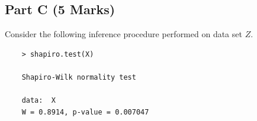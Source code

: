 \documentclass[a4paper,12pt]{article}
\begin{document}


\subsection*{Part C (5 Marks)} %


Consider the following inference procedure performed on data set $Z$.
\begin{center}
	\begin{framed}
	\begin{verbatim}
	> shapiro.test(X)
	
	Shapiro-Wilk normality test
	
	data:  X
	W = 0.8914, p-value = 0.007047
	
	\end{verbatim}
	\end{framed}
\end{center}
\end{document}
